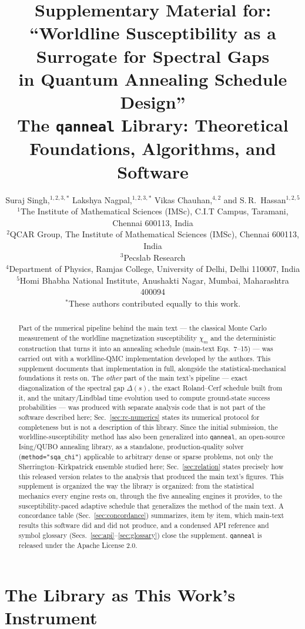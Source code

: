 \documentclass[11pt]{article}
\title{Supplementary Material for:\\
\large ``Worldline Susceptibility as a Surrogate for Spectral Gaps\\ in Quantum Annealing Schedule Design''\\[8pt]
\normalsize The \texttt{qanneal} Library: Theoretical Foundations, Algorithms, and Software}
\author{
Suraj Singh,$^{1,2,3,*}$ Lakshya Nagpal,$^{1,2,3,*}$ Vikas Chauhan,$^{4,2}$ and S.\,R.\ Hassan$^{1,2,5}$\\[4pt]
\small $^{1}$The Institute of Mathematical Sciences (IMSc), C.I.T Campus, Taramani, Chennai 600113, India\\
\small $^{2}$QCAR Group, The Institute of Mathematical Sciences (IMSc), Chennai 600113, India\\
\small $^{3}$Pecslab Research\\
\small $^{4}$Department of Physics, Ramjas College, University of Delhi, Delhi 110007, India\\
\small $^{5}$Homi Bhabha National Institute, Anushakti Nagar, Mumbai, Maharashtra 400094\\[4pt]
\small $^{*}$These authors contributed equally to this work.
}
\date{}
\newcommand{\chim}{\chi_{m}}
\begin{document}
\maketitle

\begin{abstract}
\noindent
Part of the numerical pipeline behind the main text --- the classical Monte Carlo measurement of
the worldline magnetization susceptibility $\chim$ and the deterministic construction that turns it
into an annealing schedule (main-text Eqs.~7--15) --- was carried out with a worldline-QMC
implementation developed by the authors. This supplement documents that implementation in full,
alongside the statistical-mechanical foundations it rests on. The \emph{other} part of the main
text's pipeline --- exact diagonalization of the spectral gap $\Delta(s)$, the exact Roland--Cerf
schedule built from it, and the unitary/Lindblad time evolution used to compute ground-state
success probabilities --- was produced with separate analysis code that is not part of the software
described here; Sec.~\ref{sec:rc-numerics} states its numerical protocol for completeness but is not
a description of this library. Since the initial submission, the worldline-susceptibility method has
also been generalized into \texttt{qanneal}, an open-source Ising/QUBO annealing library, as a
standalone, production-quality solver (\texttt{method="sqa\_chi"}) applicable to arbitrary dense or
sparse problems, not only the Sherrington--Kirkpatrick ensemble studied here; Sec.~\ref{sec:relation}
states precisely how this released version relates to the analysis that produced the main text's
figures. This supplement is organized the way the library is organized: from the statistical
mechanics every engine rests on, through the five annealing engines it provides, to the
susceptibility-paced adaptive schedule that generalizes the method of the main text. A concordance
table (Sec.~\ref{sec:concordance}) summarizes, item by item, which
main-text results this software did and did not produce, and a condensed API reference and symbol
glossary (Secs.~\ref{sec:api}--\ref{sec:glossary}) close the supplement. \texttt{qanneal} is released
under the Apache License 2.0.
\end{abstract}

\tableofcontents

\section{The Library as This Work's Instrument}
\label{sec:intro}
\end{document}
